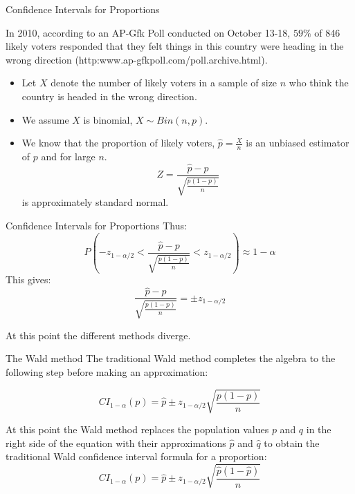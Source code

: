 \documentclass[
  ignorenonframetext,
]{beamer}
\begin{document}
\begin{frame}{Confidence Intervals for Proportions}
\protect\hypertarget{confidence-intervals-for-proportions}{}
\begin{tcolorbox}
In 2010, according to an AP-Gfk Poll conducted on October 13-18, $59\%$ of 846 likely voters responded that they felt things in this country were heading in the wrong direction (http:www.ap-gfkpoll.com/poll.archive.html). 
\end{tcolorbox}

\begin{itemize}
\item
  Let \(X\) denote the number of likely voters in a sample of size \(n\)
  who think the country is headed in the wrong direction.
\item
  We assume \(X\) is binomial, \(X\sim Bin(n, p)\).
\item
  We know that the proportion of likely voters, \(\hat{p}=\frac{X}{n}\)
  is an unbiased estimator of \(p\) and for large \(n\).
  \[Z=\frac{\hat{p}-p}{\sqrt{\frac{p(1-p)}{n}}}\] is approximately
  standard normal.
\end{itemize}
\end{frame}

\begin{frame}{Confidence Intervals for Proportions}
\protect\hypertarget{confidence-intervals-for-proportions-1}{}
Thus:
\[P\left(-z_{1-\alpha/2}<\frac{\hat{p}-p}{\sqrt{\frac{p(1-p)}{n}}}<z_{1-\alpha/2}\right)\approx 1-\alpha \]
This gives:
\[\frac{\hat{p}-p}{\sqrt{\frac{p(1-p)}{n}}}=\pm z_{1-\alpha/2}\]

At this point the different methods diverge.
\end{frame}

\begin{frame}{The Wald method}
\protect\hypertarget{the-wald-method}{}
The traditional Wald method completes the algebra to the following step
before making an approximation:

\[CI_{1 - \alpha}(p) = \hat{p}\pm z_{1-\alpha/2}\sqrt{\frac{p(1-p)}{n}}\]

At this point the Wald method replaces the population values \(p\) and
\(q\) in the right side of the equation with their approximations
\(\hat{p}\) and \(\hat{q}\) to obtain the traditional Wald confidence
interval formula for a proportion:
\[CI_{1 - \alpha}(p)=\hat{p}\pm z_{1-\alpha/2}\sqrt{\frac{\hat{p}(1-\hat{p})}{n}}\]
\end{frame}
\end{document}
